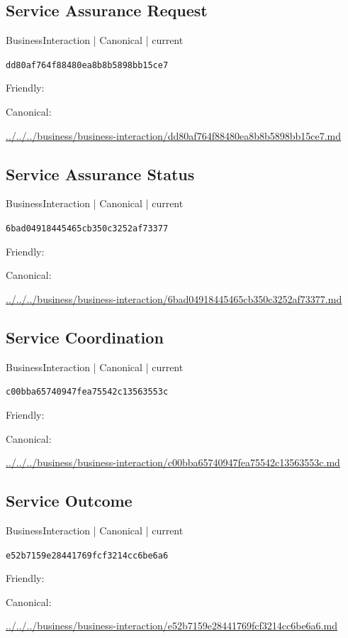 \documentclass[10pt,a4paper]{article}
\begin{document}
\subsection*{Service Assurance Request}
{\small BusinessInteraction | Canonical | current}\par
\texttt{dd80af764f88480ea8b8b5898bb15ce7}\par
Friendly: \par
Canonical: \par
{\footnotesize\url{../../../business/business-interaction/dd80af764f88480ea8b8b5898bb15ce7.md}}\par
\subsection*{Service Assurance Status}
{\small BusinessInteraction | Canonical | current}\par
\texttt{6bad04918445465cb350c3252af73377}\par
Friendly: \par
Canonical: \par
{\footnotesize\url{../../../business/business-interaction/6bad04918445465cb350c3252af73377.md}}\par
\subsection*{Service Coordination}
{\small BusinessInteraction | Canonical | current}\par
\texttt{c00bba65740947fea75542c13563553c}\par
Friendly: \par
Canonical: \par
{\footnotesize\url{../../../business/business-interaction/c00bba65740947fea75542c13563553c.md}}\par
\subsection*{Service Outcome}
{\small BusinessInteraction | Canonical | current}\par
\texttt{e52b7159e28441769fcf3214cc6be6a6}\par
Friendly: \par
Canonical: \par
{\footnotesize\url{../../../business/business-interaction/e52b7159e28441769fcf3214cc6be6a6.md}}\par
\end{document}
